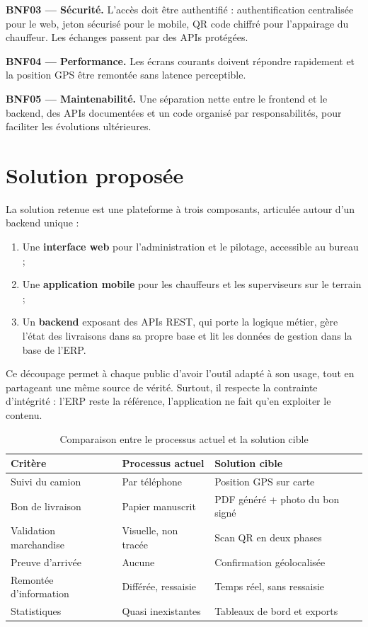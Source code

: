 \documentclass[12pt,a4paper]{report}
\begin{document}
\textbf{BNF03 — Sécurité.} L'accès doit être authentifié : authentification centralisée pour le web, jeton sécurisé pour le mobile, QR code chiffré pour l'appairage du chauffeur. Les échanges passent par des APIs protégées.

\textbf{BNF04 — Performance.} Les écrans courants doivent répondre rapidement et la position GPS être remontée sans latence perceptible.

\textbf{BNF05 — Maintenabilité.} Une séparation nette entre le frontend et le backend, des APIs documentées et un code organisé par responsabilités, pour faciliter les évolutions ultérieures.

\section{Solution proposée}

La solution retenue est une plateforme à trois composants, articulée autour d'un backend unique :

\begin{enumerate}
\item Une \textbf{interface web} pour l'administration et le pilotage, accessible au bureau ;
\item Une \textbf{application mobile} pour les chauffeurs et les superviseurs sur le terrain ;
\item Un \textbf{backend} exposant des APIs REST, qui porte la logique métier, gère l'état des livraisons dans sa propre base et lit les données de gestion dans la base de l'ERP.
\end{enumerate}

Ce découpage permet à chaque public d'avoir l'outil adapté à son usage, tout en partageant une même source de vérité. Surtout, il respecte la contrainte d'intégrité : l'ERP reste la référence, l'application ne fait qu'en exploiter le contenu.

\begin{table}[htbp]
\centering
\caption{Comparaison entre le processus actuel et la solution cible}
\label{tab:comparaison_cible}
\begin{tabular}{|p{4.5cm}|p{4.5cm}|p{4.5cm}|}
\hline
\textbf{Critère} & \textbf{Processus actuel} & \textbf{Solution cible} \\
\hline
Suivi du camion & Par téléphone & Position GPS sur carte \\
\hline
Bon de livraison & Papier manuscrit & PDF généré + photo du bon signé \\
\hline
Validation marchandise & Visuelle, non tracée & Scan QR en deux phases \\
\hline
Preuve d'arrivée & Aucune & Confirmation géolocalisée \\
\hline
Remontée d'information & Différée, ressaisie & Temps réel, sans ressaisie \\
\hline
Statistiques & Quasi inexistantes & Tableaux de bord et exports \\
\hline
\end{tabular}
\end{table}
\end{document}
